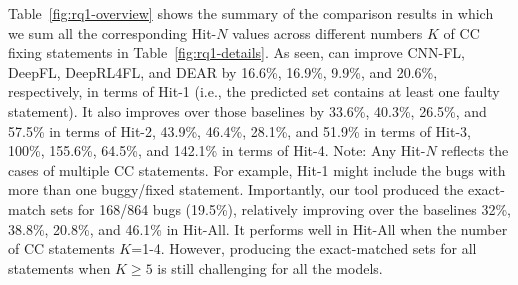 Table~\ref{fig:rq1-overview} shows the summary of the comparison
results in which we sum all the corresponding Hit-$N$ values across
different numbers $K$ of CC fixing statements in
Table~\ref{fig:rq1-details}.
%
As seen, {\tool} can improve CNN-FL, DeepFL, DeepRL4FL, and DEAR by
16.6\%, 16.9\%, 9.9\%, and 20.6\%, respectively, in terms of Hit-1
(i.e., the predicted set contains at least one faulty statement).
%
%
It also improves over those baselines by 33.6\%, 40.3\%, 26.5\%, and
57.5\% in terms of Hit-2, 43.9\%, 46.4\%, 28.1\%, and 51.9\% in terms
of Hit-3, 100\%, 155.6\%, 64.5\%, and 142.1\% in terms of Hit-4. Note:
Any Hit-$N$ reflects the cases of multiple CC statements. For example,
Hit-1 might include the bugs with more than one buggy/fixed statement.
%
Importantly, our tool produced the exact-match sets for 168/864 bugs
(19.5\%), relatively improving over the baselines 32\%, 38.8\%,
20.8\%, and 46.1\% in Hit-All. It performs well in Hit-All
when the number of CC statements $K$=1-4. However, producing the
exact-matched sets for all statements when $K \geq 5$ is still
challenging for all the models.




